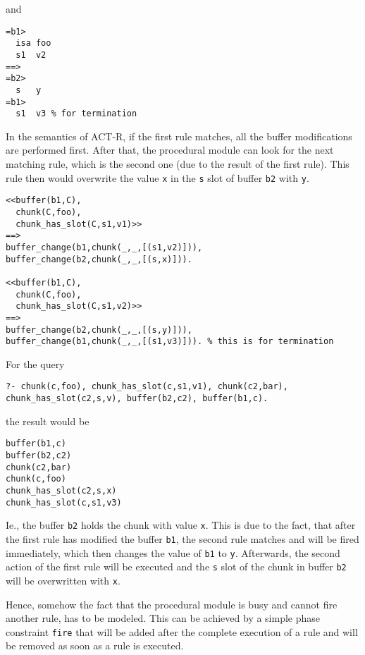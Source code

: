 and

\begin{lstlisting}
=b1>
  isa foo
  s1  v2
==>
=b2>
  s   y
=b1>
  s1  v3 % for termination
\end{lstlisting}

In the semantics of ACT-R, if the first rule matches, all the buffer modifications are performed first. After that, the procedural module can look for the next matching rule, which is the second one (due to the result of the first rule). This rule then would overwrite the value \lstinline|x| in the \lstinline|s| slot of buffer \lstinline|b2| with \lstinline|y|.

\begin{lstlisting}
<<buffer(b1,C),
  chunk(C,foo),
  chunk_has_slot(C,s1,v1)>>
==>
buffer_change(b1,chunk(_,_,[(s1,v2)])),
buffer_change(b2,chunk(_,_,[(s,x)])).

<<buffer(b1,C),
  chunk(C,foo),
  chunk_has_slot(C,s1,v2)>>
==>
buffer_change(b2,chunk(_,_,[(s,y)])),
buffer_change(b1,chunk(_,_,[(s1,v3)])). % this is for termination
\end{lstlisting}

For the query

\begin{lstlisting}
?- chunk(c,foo), chunk_has_slot(c,s1,v1), chunk(c2,bar), chunk_has_slot(c2,s,v), buffer(b2,c2), buffer(b1,c).
\end{lstlisting}

the result would be

\begin{lstlisting}
buffer(b1,c)
buffer(b2,c2)
chunk(c2,bar)
chunk(c,foo)
chunk_has_slot(c2,s,x)
chunk_has_slot(c,s1,v3)
\end{lstlisting}

Ie., the buffer \lstinline|b2| holds the chunk with value \lstinline|x|. This is due to the fact, that after the first rule has modified the buffer \lstinline|b1|, the second rule matches and will be fired immediately, which then changes the value of \lstinline|b1| to \lstinline|y|. Afterwards, the second action of the first rule will be executed and the \lstinline|s| slot of the chunk in buffer \lstinline|b2| will be overwritten with \lstinline|x|.

Hence, somehow the fact that the procedural module is busy and cannot fire another rule, has to be modeled. This can be achieved by a simple phase constraint \lstinline|fire| that will be added after the complete execution of a rule and will be removed as soon as a rule is executed.

